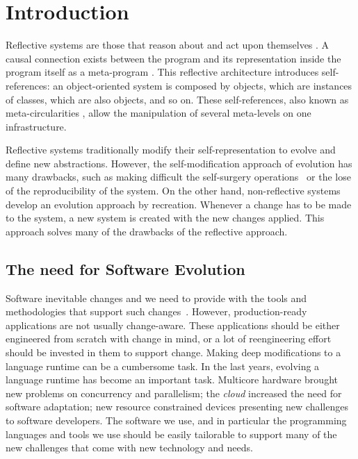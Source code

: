 
\chapter{Introduction}
\minitoc


Reflective systems are those that reason about and act upon themselves \cite{Smit84a}. A causal connection exists between the program and its representation inside the program itself as a meta-program \cite{Maes87a}. This reflective architecture introduces self-references:  an object-oriented system is composed by objects, which are instances of classes, which are also objects, and so on. These self-references, also known as meta-circularities \cite{Chib96a}, allow the manipulation of several meta-levels on one infrastructure.

Reflective systems traditionally modify their self-representation to evolve and define new abstractions. However, the self-modification approach of evolution has many drawbacks, such as making difficult the self-surgery operations~\cite{Casa09a} or the lose of the reproducibility of the system. On the other hand, non-reflective systems develop an evolution approach by recreation. Whenever a change has to be made to the system, a new system is created with the new changes applied. This approach solves many of the drawbacks of the reflective approach.


\section{The need for Software Evolution}

Software inevitable changes and we need to provide with the tools and methodologies that support such changes~\cite{Nier08b}. However, production-ready applications are not usually change-aware. These applications should be either engineered from scratch with change in mind, or a lot of reengineering effort should be invested in them to support change. Making deep modifications to a language runtime can be a cumbersome task.
In the last years, evolving a language runtime has become an important task. Multicore hardware brought new problems on concurrency and parallelism; the \emph{cloud} increased the need for software adaptation; new resource constrained devices presenting new challenges to software developers. The software we use, and in particular the programming languages and tools we use should be easily tailorable to support many of the new challenges that come with new technology and needs.

